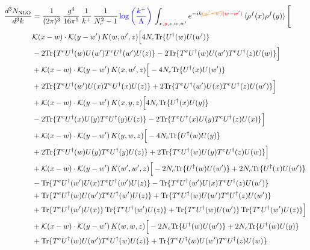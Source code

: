 \documentclass[9pt]{article}
\numberwithin{equation}{section}
\begin{document}
\begin{align}
    \frac{d^{3}N_{\mathrm{NLO}}}{d^{3}k} & = \frac{1}{(2\pi)^{3}}\,\frac{g^{4}}{16\pi^{5}}\,\frac{1}{k^{+}}\,\frac{1}{N^{2}_{c}-1}\,{\color{blue}\log{\left(\frac{k^{+}}{\Lambda}\right)}}\,\int_{x,{\color{red}y},z,w,w'}e^{-ik{\color{orange}\cancel{(w'-w)}}{\color{red}(w-w')}}\,\langle\rho^{f}(x)\rho^{f}(y) \rangle\,\Bigg[\notag \\ & \mathcal K(x-w)\cdot\mathcal K(y-w')\,K(w,w',z)\Big[4 N_{c}{\rm Tr}\{U^\dagger(w)U(w')\}\notag\\
&-2{\rm Tr}\{T^eU^\dagger(w)U(w')T^eU^\dagger(w')U(z)\}-2{\rm Tr}\{T^eU^\dagger(w)U(w')T^eU^\dagger(z)U(w)\}\Big]\notag\\
&+\mathcal K(x-w)\cdot\mathcal K(y-w')\,K(x,w',z)\Big[-4 N_{c}{\rm Tr}\{U^\dagger(x)U(w')\}\notag\\
&+2{\rm Tr}\{T^eU^\dagger(w')U(x)T^eU^\dagger(x)U(z)\}+2{\rm Tr}\{T^eU^\dagger(w')U(x)T^eU^\dagger(z)U(w')\}\Big]\notag\\
&+\mathcal K(x-w)\cdot\mathcal K(y-w')\,K(x,y,z)\Big[4 N_{c}{\rm Tr}\{U^\dagger(x)U(y)\}\notag\\
&-2{\rm Tr}\{T^eU^\dagger(x)U(y)T^eU^\dagger(y)U(z)\}-2{\rm Tr}\{T^eU^\dagger(x)U(y)T^eU^\dagger(z)U(x)\}\Big]\notag\\
&+\mathcal K(x-w)\cdot\mathcal K(y-w')\,K(y,w,z)\Big[-4 N_{c}{\rm Tr}\{U^\dagger(w)U(y)\}\notag\\
&+2{\rm Tr}\{T^eU^\dagger(w)U(y)T^eU^\dagger(y)U(z)\}+2{\rm Tr}\{T^eU^\dagger(w)U(y)T^eU^\dagger(z)U(w)\}\Big]\notag\\
&+\mathcal K(x-w)\cdot\mathcal K(y-w')\,K(w',w',z)\Big[-2 N_{c}{\rm Tr}\{U^\dagger(w)U(w')\}+2 N_{c}{\rm Tr}\{U^\dagger(x)U(w')\}\notag\\
&-{\rm Tr}\{T^eU^\dagger(w')U(x)T^eU^\dagger(w')U(z)\}-{\rm Tr}\{T^eU^\dagger(w')U(x)T^eU^\dagger(z)U(w')\}\notag\\
&+{\rm Tr}\{T^eU^\dagger(w)U(w')T^eU^\dagger(w')U(z)\}+{\rm Tr}\{T^eU^\dagger(w)U(w')T^eU^\dagger(z)U(w')\}\notag\\
&+{\rm Tr}\{T^eU^\dagger(w')U(x)\}\,{\rm Tr}\{T^eU^\dagger(w')U(z)\}+{\rm Tr}\{T^eU^\dagger(w)U(w')\}\,{\rm Tr}\{T^eU^\dagger(w')U(z)\}\Big]\notag\\
&+\mathcal K(x-w)\cdot\mathcal K(y-w')\,K(w,w,z)\Big[-2 N_{c}{\rm Tr}\{U^\dagger(w)U(w')\}+2 N_{c}{\rm Tr}\{U^\dagger(w)U(y)\}\notag\\
&+{\rm Tr}\{T^eU^\dagger(w)U(w')T^eU^\dagger(w)U(z)\}+{\rm Tr}\{T^eU^\dagger(w)U(w')T^eU^\dagger(z)U(w)\}\notag\\

\end{align}
\end{document}
